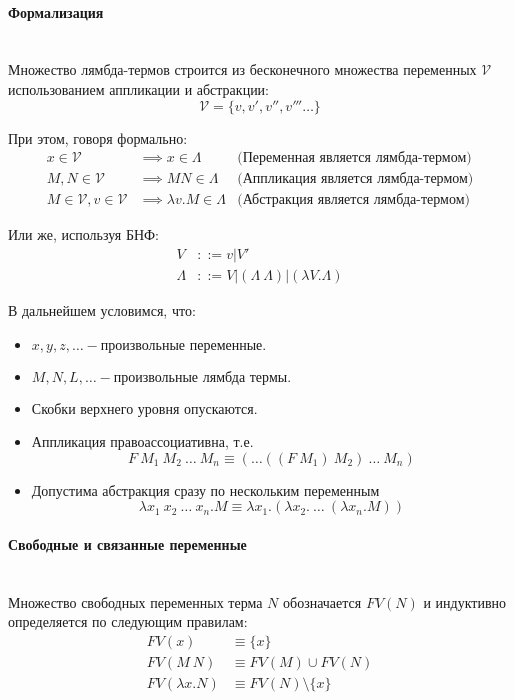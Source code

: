 \documentclass[lambda.tex]{subfiles}
\begin{document}
\newpage
\paragraph{Формализация}~\\

Множество лямбда-термов строится из бесконечного множества переменных $\mathcal{V}$ использованием аппликации и абстракции:
\[\mathcal{V} = \{ v, v', v'', v''' \dots \}\]

При этом, говоря формально:
\begin{align*}
	x \in \mathcal{V} & \implies x \in \Lambda &\text{(Переменная является лямбда-термом)}\\
	M, N \in \mathcal{V} & \implies M N \in \Lambda &\text{(Аппликация является лямбда-термом)}\\
	M \in \mathcal{V}, v \in \mathcal{V} & \implies \lambda v.M \in \Lambda &\text{(Абстракция является лямбда-термом)}
\end{align*}

Или же, используя БНФ:
\begin{align*}
		  V &::= v|V'\\
	\Lambda &::= V | (\Lambda\ \Lambda) | ( \lambda V . \Lambda )
\end{align*}

В дальнейшем условимся, что:
\begin{itemize}
	\item\(x,y,z,\dots - \text{произвольные переменные.}\)
	\item\(M,N,L,\dots - \text{произвольные лямбда термы.}\)
	\item Скобки верхнего уровня опускаются.
	\item Аппликация правоассоциативна, т.е.\\
		\[F\ M_1 \ M_2 \ \dots\ M_n \equiv (\dots((F\ M_1)\ M_2)\ \dots\ M_n)\]
	\item Допустима абстракция сразу по нескольким переменным
		\[\lambda x_1 \ x_2 \ \dots\ x_n .M \equiv \lambda x_1 .(\lambda x_2 .\ \dots\ (\lambda x_n .M))\]
\end{itemize}

\newpage
\paragraph{Свободные и связанные переменные} %
\label{par:free_and_bound} ~\\

Множество свободных переменных терма $N$ обозначается $FV(N)$ и индуктивно определяется по следующим правилам:
\begin{align*}
	FV(x) 			&\equiv \{x\}\\
	FV(M\ N) 		&\equiv FV(M)\cup FV(N)\\
	FV(\lambda x.N) &\equiv FV(N)\setminus\{x\}
\end{align*}
\end{document}
